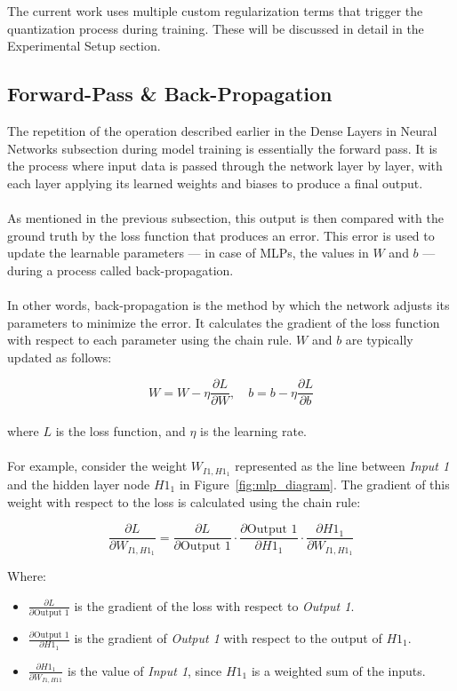 \noindent The current work uses multiple custom regularization terms that trigger the quantization process during training. 
These will be discussed in detail in the Experimental Setup section.

\subsection{Forward-Pass \& Back-Propagation}
\label{subsec:subsection2}
The repetition of the operation described earlier in the Dense Layers in Neural Networks subsection during model training 
is essentially the forward pass. It is the process where input data is passed through the network layer by layer, 
with each layer applying its learned weights and biases to produce a final output. 
\\
\\
As mentioned in the previous subsection, this output is then compared with the ground truth by the loss function that produces an error.
This error is used to update the learnable parameters — in case of MLPs, the values in \( W \) and \( b \) — during a process called back-propagation.
\\
\\
In other words, back-propagation is the method by which the network adjusts its parameters to minimize the error. 
It calculates the gradient of the loss function with respect to each parameter using the chain rule. 
\( W \) and \( b \) are typically updated as follows:

\[
W = W - \eta \frac{\partial L}{\partial W}, \quad b = b - \eta \frac{\partial L}{\partial b}
\]
\\
\noindent where \( L \) is the loss function, and \( \eta \) is the learning rate.
\\
\\
For example, consider the weight \( W_{I1,H1_1} \) represented as the line between \textit{Input 1} and the hidden layer node \( H1_1 \) in Figure~\ref{fig:mlp_diagram}. 
The gradient of this weight with respect to the loss is calculated using the chain rule:

\[
\frac{\partial L}{\partial W_{I1,H1_1}} = \frac{\partial L}{\partial \text{Output 1}} \cdot \frac{\partial \text{Output 1}}{\partial H1_1} \cdot \frac{\partial H1_1}{\partial W_{I1,H1_1}}
\]

\noindent Where:
\begin{itemize}
    \item \( \frac{\partial L}{\partial \text{Output 1}} \) is the gradient of the loss with respect to \textit{Output 1}.
    \item \( \frac{\partial \text{Output 1}}{\partial H1_1} \) is the gradient of \textit{Output 1} with respect to the output of \( H1_1 \).
    \item \( \frac{\partial H1_1}{\partial W_{I1,H11}} \) is the value of \textit{Input 1}, since \( H1_1 \) is a weighted sum of the inputs.
\end{itemize}

